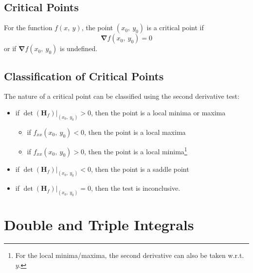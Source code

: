 \documentclass{article}
\begin{document}
\subsection{Critical Points}
For the function $f(x,\: y)$, the point $(x_0,\: y_0)$ is a critical point if
\begin{equation*}
    \symbf{\nabla}f(x_0,\: y_0) = 0
\end{equation*}
or if $\symbf{\nabla}f(x_0,\: y_0)$ is undefined.
\subsection{Classification of Critical Points}
The nature of a critical point can be classified using the second derivative test:
\begin{itemize}
    \item if $\left.\det{\left(\mathbf{H}_f\right)}\right|_{(x_0,\: y_0)} > 0$, then the point is a local minima or maxima
    \begin{itemize}
        \item if $f_{xx}(x_0, \: y_0) < 0$, then the point is a local maxima
        \item if $f_{xx}(x_0, \: y_0) > 0$, then the point is a local minima\footnote[1]{For the local minima/maxima, the second derivative can also be taken w.r.t. $y$.}
    \end{itemize}
    \item if $\left.\det{\left(\mathbf{H}_f\right)}\right|_{(x_0,\: y_0)} < 0$, then the point is a saddle point
    \item if $\left.\det{\left(\mathbf{H}_f\right)}\right|_{(x_0,\: y_0)} = 0$, then the test is inconclusive.
\end{itemize}
\newpage
\section{Double and Triple Integrals}
\end{document}
